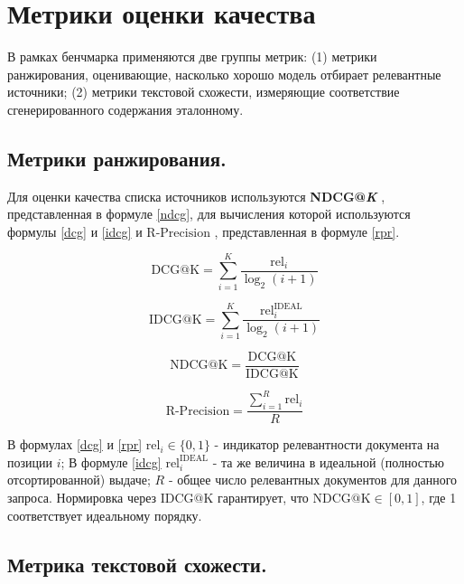 \documentclass{article}
\theoremstyle{definition}
\theoremstyle{plain}
\begin{document}
\section*{Метрики оценки качества}

В рамках бенчмарка применяются две группы метрик:  
(1) метрики ранжирования, оценивающие, насколько хорошо модель отбирает релевантные источники;  
(2) метрики текстовой схожести, измеряющие соответствие сгенерированного содержания эталонному.

\subsection*{Метрики ранжирования.}

Для оценки качества списка источников используются \textbf{NDCG@\textit{K}} \cite{ndcg}, представленная в формуле \eqref{ndcg}, для вычисления которой используются формулы \eqref{dcg} и \eqref{idcg} и $\mathrm{R\text{-}Precision}$ \cite{rprecision}, 
представленная в формуле \eqref{rpr}.

\begin{equation}\label{dcg}
\mathrm{DCG@K}= \sum_{i=1}^{K} \frac{\mathrm{rel}_i}{\log_2(i+1)}
\end{equation}

\begin{equation}\label{idcg}
\mathrm{IDCG@K}= \sum_{i=1}^{K} \frac{\mathrm{rel}^{\mathrm{IDEAL}}_i}{\log_2(i+1)}
\end{equation}

\begin{equation}\label{ndcg}
\mathrm{NDCG@K}= \frac{\mathrm{DCG@K}}{\mathrm{IDCG@K}}
\end{equation}

\begin{equation}\label{rpr}
\mathrm{R\text{-}Precision}= \frac{\sum_{i=1}^{R} \mathrm{rel}_i}{R}
\end{equation}

В формулах \eqref{dcg} и \eqref{rpr} \(\mathrm{rel}_i\in\{0,1\}\) - индикатор релевантности документа на позиции \(i\);  
В формуле \eqref{idcg} \(\mathrm{rel}^{\mathrm{IDEAL}}_i\) - та же величина в идеальной (полностью отсортированной) выдаче;  
\(R\) - общее число релевантных документов для данного запроса.  
Нормировка через \(\mathrm{IDCG@K}\) гарантирует, что \(\mathrm{NDCG@K}\in[0,1]\), где 1 соответствует идеальному порядку.

\subsection*{Метрика текстовой схожести.}
\end{document}
